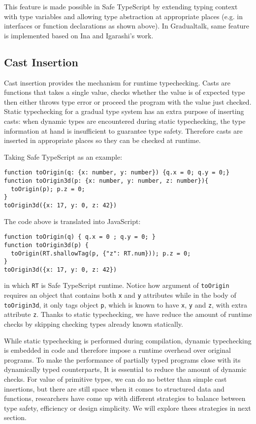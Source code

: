This feature is made possible in Safe TypeScript by extending typing context with type variables
and allowing type abstraction at appropriate places
(e.g. in interfaces or function declarations as shown above).
In Gradualtalk, same feature is implemented based on
Ina and Igarashi's work\cite{ina2011gradual}.

\subsection{Cast Insertion}

Cast insertion provides the mechanism for runtime typechecking.
Casts are functions that takes a single value, checks whether the value is of expected type
then either throws type error or proceed the program with the value just checked.
Static typechecking for a gradual type system has an extra purpose of inserting casts:
when dynamic types are encountered during static typechecking, the type information
at hand is insufficient to guarantee type safety. Therefore casts are inserted
in appropriate places so they can be checked at runtime.

Taking Safe TypeScript as an example:

\begin{verbatim}
function toOrigin(q: {x: number, y: number}) {q.x = 0; q.y = 0;}
function toOrigin3d(p: {x: number, y: number, z: number}){
  toOrigin(p); p.z = 0;
}
toOrigin3d({x: 17, y: 0, z: 42})
\end{verbatim}

The code above is translated into JavaScript:

\begin{verbatim}
function toOrigin(q) { q.x = 0 ; q.y = 0; }
function toOrigin3d(p) {
  toOrigin(RT.shallowTag(p, {"z": RT.num})); p.z = 0;
}
toOrigin3d({x: 17, y: 0, z: 42})
\end{verbatim}

in which \texttt{RT} is Safe TypeScript runtime.
Notice how argument of \texttt{toOrigin} requires an object that contains
both \texttt{x} and \texttt{y} attributes while in the body of
\texttt{toOrigin3d}, it only tags object \texttt{p},
which is known to have \texttt{x}, \texttt{y} and  \texttt{z}, with extra attribute \texttt{z}.
Thanks to static typechecking, we have reduce the amount of runtime checks
by skipping checking types already known statically.

While static typechecking is performed during compilation,
dynamic typechecking is embedded in code and therefore impose a runtime overhead over original programs.
To make the performance of partially typed programs close with its dynamically typed counterparts,
It is essential to reduce the amount of dynamic checks.
For value of primitive types, we can do no better than simple cast insertions,
but there are still space when it comes to structured data and functions,
researchers have come up with different strategies to balance between type safety, efficiency or design simplicity. We will explore thees strategies in next section.

